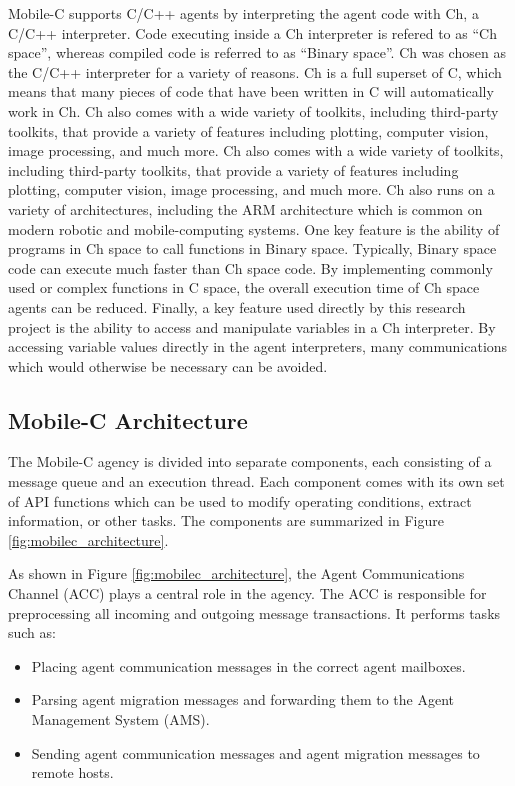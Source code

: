      Mobile-C supports C/C++ agents by interpreting the agent code with
        Ch, a C/C++ interpreter.
      Code executing inside a Ch interpreter is refered to as ``Ch space'',
        whereas compiled code is referred to as ``Binary space''.
      Ch was chosen as the C/C++ interpreter for a variety of reasons.
      Ch is a full superset of C, which means that many pieces of
        code that have been written in C will automatically work in Ch.
      Ch also comes with a wide variety of toolkits, including third-party
        toolkits, that provide a variety of features including plotting,
      computer vision, image processing, and much more.
      Ch also comes with a wide variety of toolkits, including third-party
        toolkits, that provide a variety of features including plotting,
        computer vision, image processing, and much more.
      Ch also runs on a variety of architectures, including the ARM 
        architecture which is common on modern robotic and mobile-computing
        systems.
      One key feature is the ability of programs in Ch space to call functions
        in Binary space. 
      Typically, Binary space code can execute much faster than Ch space code.
      By implementing commonly used or complex functions in C space, the overall
        execution time of Ch space agents can be reduced.
      Finally, a key feature used directly by this research project is the
        ability to access and manipulate variables in a Ch interpreter.
      By accessing variable values directly in the agent interpreters, 
        many communications which would otherwise be necessary can be avoided.

    \subsection{Mobile-C Architecture} %
      The Mobile-C agency is divided into separate components, each consisting
        of a message queue and an execution thread. 
      Each component comes with its own set of API functions which can be used 
        to modify operating conditions, extract information, or other tasks.
      The components are summarized in Figure \ref{fig:mobilec_architecture}.

      As shown in Figure \ref{fig:mobilec_architecture}, the Agent 
        Communications Channel (ACC) plays a central role in the agency. 
      The ACC is responsible for preprocessing all incoming and outgoing 
        message transactions.
      It performs tasks such as:
      \begin{itemize}
        \item Placing agent communication messages in the correct agent mailboxes.
        \item Parsing agent migration messages and forwarding them to
          the Agent Management System (AMS).
        \item Sending agent communication messages and agent migration
          messages to remote hosts.
      \end{itemize}

